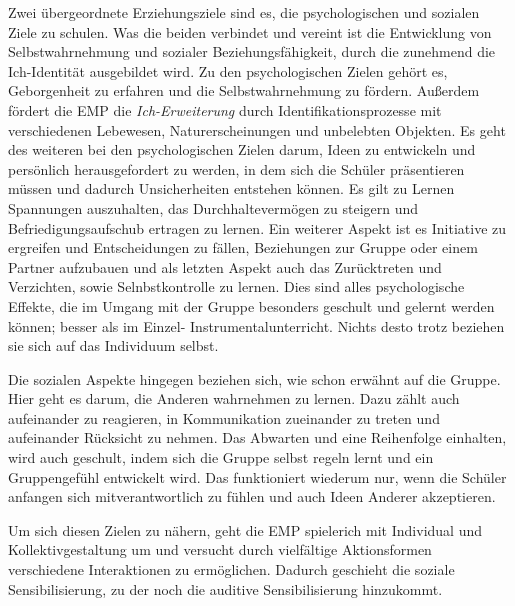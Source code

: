 Zwei übergeordnete Erziehungsziele sind es, die psychologischen und sozialen
Ziele zu schulen. Was die beiden verbindet und vereint ist die Entwicklung
von Selbstwahrnehmung und sozialer Beziehungsfähigkeit, durch die zunehmend die
Ich-Identität ausgebildet wird. Zu den psychologischen Zielen gehört es,
Geborgenheit zu erfahren und die Selbstwahrnehmung zu fördern. Außerdem fördert
die EMP die \emph{Ich-Erweiterung} durch Identifikationsprozesse mit verschiedenen
Lebewesen, Naturerscheinungen und unbelebten Objekten. Es geht des weiteren bei
den psychologischen Zielen darum, Ideen zu entwickeln und persönlich
herausgefordert zu werden, in dem sich die Schüler präsentieren müssen und
dadurch Unsicherheiten entstehen können. Es gilt zu Lernen Spannungen
auszuhalten, das Durchhaltevermögen zu steigern und Befriedigungsaufschub
ertragen zu lernen. Ein weiterer Aspekt ist es Initiative zu ergreifen und
Entscheidungen zu fällen, Beziehungen zur Gruppe oder einem Partner aufzubauen
und als letzten Aspekt auch das Zurücktreten und Verzichten, sowie
Selnbstkontrolle zu lernen. Dies sind alles psychologische Effekte, die im
Umgang mit der Gruppe besonders geschult und gelernt werden können; besser als
im Einzel- Instrumentalunterricht. Nichts desto trotz beziehen sie sich auf das
Individuum selbst.

Die sozialen Aspekte hingegen beziehen sich, wie schon erwähnt auf die Gruppe.
Hier geht es darum, die Anderen wahrnehmen zu lernen. Dazu zählt auch
aufeinander zu reagieren, in Kommunikation zueinander zu treten und aufeinander
Rücksicht zu nehmen. Das Abwarten und eine Reihenfolge einhalten, wird auch
geschult, indem sich die Gruppe selbst regeln lernt und ein Gruppengefühl
entwickelt wird. Das funktioniert wiederum nur, wenn die Schüler anfangen sich
mitverantwortlich zu fühlen und auch Ideen Anderer akzeptieren.

Um sich diesen Zielen zu nähern, geht die EMP spielerich mit Individual und
Kollektivgestaltung um und versucht durch vielfältige Aktionsformen verschiedene
Interaktionen zu ermöglichen. Dadurch geschieht die soziale Sensibilisierung, zu
der noch die auditive Sensibilisierung hinzukommt. 



